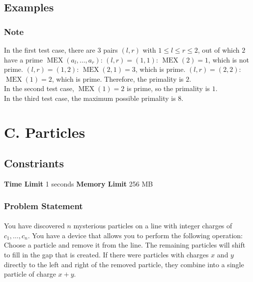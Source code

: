 \documentclass{article}
\begin{document}
\subsection*{Examples}
\subsubsection*{Note}In the first test case, there are $3$ pairs $(l,r)$ with $1 \le l \le r \le 2$, out of which $2$ have a prime $\operatorname{MEX}(a_l,\dots,a_r)$:   $(l,r) = (1,1)$: $\operatorname{MEX}(2) = 1$, which is not prime.  $(l,r) = (1,2)$: $\operatorname{MEX}(2,1) = 3$, which is prime.  $(l,r) = (2,2)$: $\operatorname{MEX}(1) = 2$, which is prime.  Therefore, the primality is $2$.\\ In the second test case, $\operatorname{MEX}(1) = 2$ is prime, so the primality is $1$.\\ In the third test case, the maximum possible primality is $8$.
\newpage
\section*{C. Particles}
\subsection*{Constriants}
\textbf{Time Limit}
1 seconds
\hfill
\textbf{Memory Limit}
256 MB
\subsubsection*{Problem Statement}
\paragraph{}You have discovered $n$ mysterious particles on a line with integer charges of $c_1,\dots,c_n$. You have a device that allows you to perform the following operation:   Choose a particle and remove it from the line. The remaining particles will shift to fill in the gap that is created. If there were particles with charges $x$ and $y$ directly to the left and right of the removed particle, they combine into a single particle of charge $x+y$. 
\end{document}
